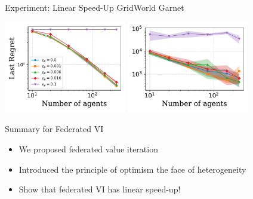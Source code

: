 \documentclass[aspectratio=169,12pt]{beamer}
\begin{document}
\begin{frame}{Experiment: Linear Speed-Up}
  \qquad \qquad \qquad \qquad GridWorld \qquad \qquad \qquad \qquad \qquad Garnet

  \vspace{-1.5em}
  
  \begin{center}
    \includegraphics[width=0.4\textwidth]{images/experiment_one_gridworld.pdf}%
    \includegraphics[width=0.4\textwidth]{images/experiment_one_garnet.pdf}  
  \end{center}
\end{frame}


\begin{frame}{Summary for Federated VI}
    \begin{itemize}
    \item We proposed federated value iteration
    \item Introduced the principle of optimism the face of heterogeneity
    \item Show that federated VI has linear speed-up!
    \end{itemize}
\end{frame}
\end{document}
